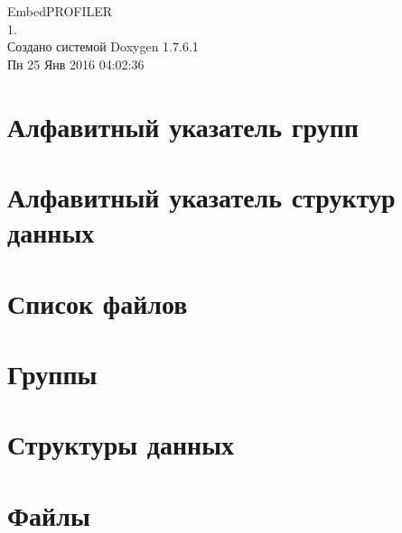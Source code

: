 \documentclass[a4paper]{book}
\begin{document}
\hypersetup{pageanchor=false,citecolor=blue}
\begin{titlepage}
\vspace*{7cm}
\begin{center}
{\Large \-Embed\-P\-R\-O\-F\-I\-L\-E\-R \\[1ex]\large 1. }\\
\vspace*{1cm}
{\large Создано системой Doxygen 1.7.6.1}\\
\vspace*{0.5cm}
{\small Пн 25 Янв 2016 04:02:36}\\
\end{center}
\end{titlepage}
\clearemptydoublepage
{}
\tableofcontents
\clearemptydoublepage
{}
\hypersetup{pageanchor=true,citecolor=blue}
\chapter{Алфавитный указатель групп}

\chapter{Алфавитный указатель структур данных}

\chapter{Список файлов}

\chapter{Группы}


\chapter{Структуры данных}


\chapter{Файлы}


\printindex
\end{document}

